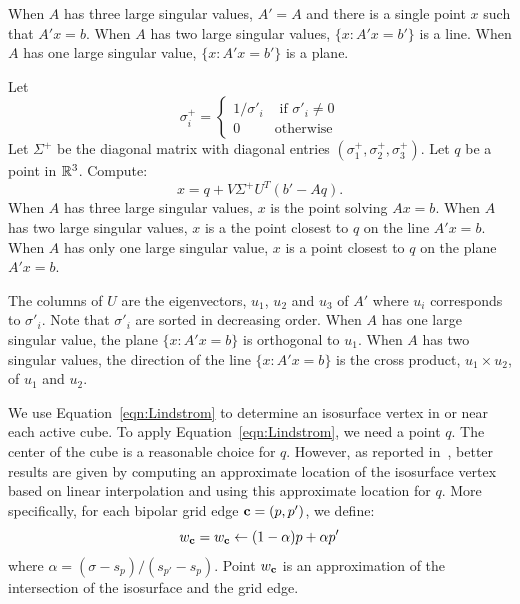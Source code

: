 When $A$ has three large singular values, $A' = A$
and there is a single point $x$ such that $A'x = b$.
When $A$ has two large singular values, 
$\{x : A'x = b' \}$ is a line.
When $A$ has one large singular value, 
$\{ x: A'x = b' \}$ is a plane.

Let 
\begin{equation*}
\sigma^+_i = \left \{ 
\begin{array}{ll}
1/\sigma'_i & \mbox { if } \sigma'_i \neq 0 \\
0 & \mbox{otherwise}
\end{array}
\right .
\end{equation*}
Let $\Sigma^+$ be the diagonal matrix with diagonal entries
$(\sigma^+_1, \sigma^+_2, \sigma^+_3)$.
Let $q$ be a point in $\mathbb{R}^{3}$.
Compute:
\begin{equation}
x = q + V \Sigma^+ U^T(b' - Aq).
\label{eqn:Lindstrom}
\end{equation}
When $A$ has three large singular values,
$x$ is the point solving $Ax = b$.
When $A$ has two large singular values,
$x$ is a the point closest to $q$ on the line $A'x = b$.
When $A$ has only one large singular value,
$x$ is a point closest to $q$ on the plane $A'x = b$.

The columns of $U$ are the eigenvectors, $u_1$, $u_2$ and $u_3$ of $A'$
where $u_i$ corresponds to $\sigma'_i$.
Note that $\sigma'_i$ are sorted in decreasing order.
When $A$ has one large singular value,
the plane $\{x: A'x = b\}$ is orthogonal to $u_1$.
When $A$ has two singular values,
the direction of the line $\{x: A'x = b\}$ 
is the cross product, $u_1 \times u_2$, of $u_1$ and $u_2$.

We use Equation~\ref{eqn:Lindstrom}
to determine an isosurface vertex in or near each active cube.
To apply Equation~\ref{eqn:Lindstrom},
we need a point $q$.
The center of the cube is a reasonable choice for $q$.
However, as reported in~\cite{sw-dcss-02},
better results are given by computing an approximate location
of the isosurface vertex based on linear interpolation
and using this approximate location for $q$.
More specifically,
for each bipolar grid edge $\mathbf{c}=(p,p')$,
we define:
\begin{equation*}
w_{\mathbf{c}} = w_{\mathbf{c}} \leftarrow (1-\alpha) p + \alpha p'
\end{equation*}
where $\alpha = (\sigma-s_p)/(s_{p'}-s_p)$.
Point $w_{\mathbf{c}}$ is an approximation of the intersection of the isosurface
and the grid edge.
